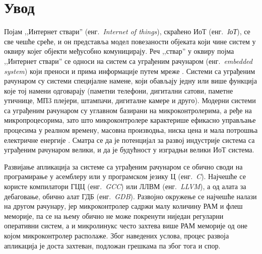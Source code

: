 \documentclass[12pt,oneside]{memoir}
\begin{document}
\frontmatter
\naslovna
\komisija
\apstrakt
\tableofcontents*

\mainmatter

\chapter{Увод}
Појам ,,Интернет ствари'' (енг.~\textit{Internet of things}), скраћено ИоТ (енг.~\textit{IоТ}), се све чешће среће, и он представља модел повезаности објеката који чине систем у оквиру којег објекти међусобно комуницирају. Реч ,,ствар'' у оквиру појма ,,Интернет ствари'' се односи на систем са уграђеним рачунаром (енг.~\textit{embedded system}) који преноси и прима информације путем мреже \cite{iot}. Системи са уграђеним рачунаром су системи специјалне намене, који обављају једну или више функција које тој намени одговарају (паметни телефони, дигитални сатови, паметне утичнице, МП3 плејери, штампачи, дигиталне камере и друго). Модерни системи са уграђеним рачунаром су углавном базирани на микроконтролерима, а ређе на микропроцесорима, зато што микроконтролере карактерише ефикасно управљање процесима у реалном времену, масовна производња, ниска цена и мала потрошња електричне енергије \cite{embedded}. Сматра се да је потенцијал за развој индустрије система са уграђеним рачунаром велики, и да је будућност у изградњи велики ИоТ система.

Развијање апликација за системе са уграђеним рачунаром се обично своди на програмирање у асемблеру или у програмском језику Ц (енг.~\textit{C}). Најчешће се користе компилатори ГЦЦ (енг.~\textit{GCC}) или ЛЛВМ (енг.~\textit{LLVM}), а од алата за дебаговање, обично алат ГДБ (енг.~\textit{GDB}). Развојно окружење се најчешће налази на другом рачунару, јер микроконтролер садржи малу количину РАМ и флеш меморије, па се на  њему обично не може покренути ниједан регуларни оперативни систем, а и микролинукс често захтева више РАМ меморије од оне којом микроконтролер располаже. Због наведених услова, процес развоја апликација је доста захтеван, подложан грешкама па због тога и спор.
\end{document}
